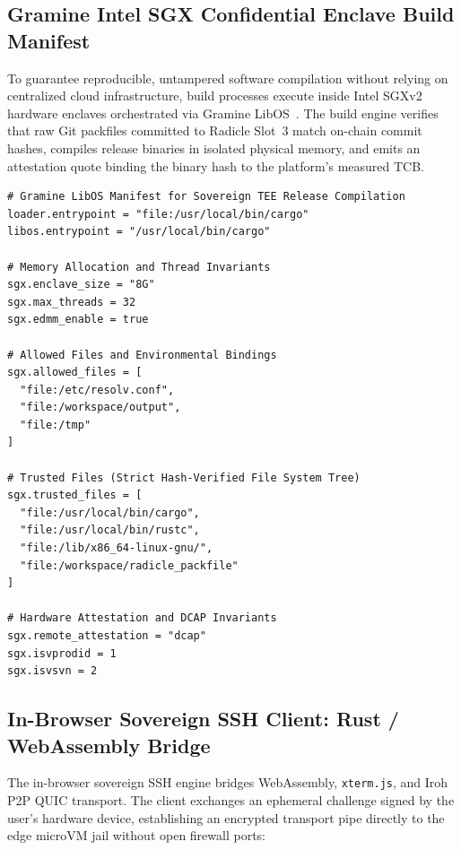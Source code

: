 \documentclass[a4paper,11pt,twoside,parskip=half-,headings=small]{scrartcl}
\newcommand{\code}[1]{\texttt{#1}}
\begin{document}
\subsection{Gramine Intel SGX Confidential Enclave Build Manifest}
\label{sec:gramine_manifest}

To guarantee reproducible, untampered software compilation without relying on
centralized cloud infrastructure, build processes execute inside Intel SGXv2
hardware enclaves orchestrated via Gramine LibOS~\cite{tsai2014graphene,graminedocs}.
The build engine verifies that raw Git packfiles committed to Radicle Slot~3
match on-chain commit hashes, compiles release binaries in isolated physical memory,
and emits an attestation quote binding the binary hash to the platform's measured
TCB.

\begin{lstlisting}[caption={Gramine SGX Enclave Manifest Template for Deterministic Release Compilation (\code{gramine/sovereign\_build.manifest.template})}]
# Gramine LibOS Manifest for Sovereign TEE Release Compilation
loader.entrypoint = "file:/usr/local/bin/cargo"
libos.entrypoint = "/usr/local/bin/cargo"

# Memory Allocation and Thread Invariants
sgx.enclave_size = "8G"
sgx.max_threads = 32
sgx.edmm_enable = true

# Allowed Files and Environmental Bindings
sgx.allowed_files = [
  "file:/etc/resolv.conf",
  "file:/workspace/output",
  "file:/tmp"
]

# Trusted Files (Strict Hash-Verified File System Tree)
sgx.trusted_files = [
  "file:/usr/local/bin/cargo",
  "file:/usr/local/bin/rustc",
  "file:/lib/x86_64-linux-gnu/",
  "file:/workspace/radicle_packfile"
]

# Hardware Attestation and DCAP Invariants
sgx.remote_attestation = "dcap"
sgx.isvprodid = 1
sgx.isvsvn = 2
\end{lstlisting}

\subsection{In-Browser Sovereign SSH Client: Rust / WebAssembly Bridge}
\label{sec:ssh_code}

The in-browser sovereign SSH engine bridges WebAssembly, \code{xterm.js}, and
Iroh P2P QUIC transport. The client exchanges an ephemeral challenge signed by
the user's hardware device, establishing an encrypted transport pipe directly
to the edge microVM jail without open firewall ports:
\end{document}
